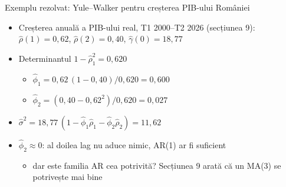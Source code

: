 \begin{frame}{Exemplu rezolvat: Yule--Walker pentru creșterea PIB-ului României}
\itemsize{\footnotesize}
\begin{itemize}
    \item Creșterea anuală a PIB-ului real, T1 2000--T2 2026 (secțiunea 9): $\hat\rho(1) = 0{,}62$, $\hat\rho(2) = 0{,}40$, $\hat\gamma(0) = 18{,}77$
    \item Determinantul $1 - \hat\rho_1^2 = 0{,}620$
    \begin{itemize}
        \item $\hat\phi_1 = 0{,}62\,(1 - 0{,}40)/0{,}620 = 0{,}600$
        \item $\hat\phi_2 = (0{,}40 - 0{,}62^2)/0{,}620 = 0{,}027$
    \end{itemize}
    \item $\hat\sigma^2 = 18{,}77\,(1 - \hat\phi_1\hat\rho_1 - \hat\phi_2\hat\rho_2) = 11{,}62$
    \item $\hat\phi_2 \approx 0$: al doilea lag nu aduce nimic, AR(1) ar fi suficient
    \begin{itemize}
        \item dar este familia AR cea potrivită? Secțiunea 9 arată că un MA(3) se potrivește mai bine
    \end{itemize}
\end{itemize}
\end{frame}

